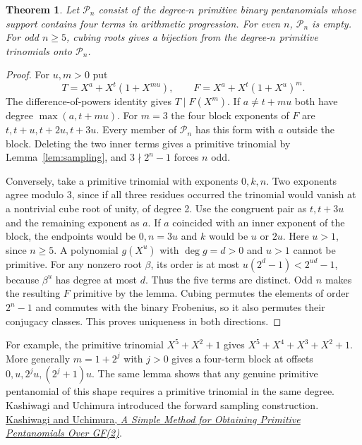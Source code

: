 \documentclass[11pt]{article}
\newtheorem{theorem}{Theorem}
\begin{document}
\begin{theorem}\label{thm:progression}
Let \(\mathcal P_n\) consist of the degree-\(n\) primitive binary
pentanomials whose support contains four terms in arithmetic progression.
For even \(n\), \(\mathcal P_n\) is empty. For odd \(n\ge5\), cubing
roots gives a bijection from the degree-\(n\) primitive trinomials
onto \(\mathcal P_n\).
\end{theorem}
\begin{proof}
For \(u,m>0\) put
\[
 T=X^a+X^t(1+X^{mu}),\qquad F=X^a+X^t(1+X^u)^m .
\]
The difference-of-powers identity gives \(T\mid F(X^m)\). If
\(a\ne t+mu\) both have degree \(\max(a,t+mu)\). For \(m=3\) the
four block exponents of \(F\) are \(t,t+u,t+2u,t+3u\). Every member
of \(\mathcal P_n\) has this form with \(a\) outside the block.
Deleting the two inner terms gives a primitive trinomial by
Lemma~\ref{lem:sampling}, and \(3\nmid 2^n-1\) forces \(n\) odd.

Conversely, take a primitive trinomial with exponents \(0,k,n\).
Two exponents agree modulo 3, since if all three residues occurred the
trinomial would vanish at a nontrivial cube root of unity, of degree 2.
Use the congruent pair as \(t,t+3u\) and the remaining exponent as \(a\).
If \(a\) coincided with an inner exponent of the block, the endpoints
would be \(0,n=3u\) and \(k\) would be \(u\) or \(2u\).
Here \(u>1\), since \(n\ge5\). A polynomial \(g(X^u)\) with
\(\deg g=d>0\) and \(u>1\) cannot be primitive. For any nonzero
root \(\beta\), its order is at most \(u(2^d-1)<2^{ud}-1\),
because \(\beta^u\) has degree at most \(d\).
Thus the five terms are distinct. Odd \(n\) makes the resulting \(F\)
primitive by the lemma. Cubing permutes the elements of order \(2^n-1\)
and commutes with the binary Frobenius, so it also permutes their
conjugacy classes. This proves uniqueness in both directions.
\end{proof}
For example, the primitive trinomial \(X^5+X^2+1\) gives
\(X^5+X^4+X^3+X^2+1\).
More generally \(m=1+2^j\) with \(j>0\) gives a four-term block
at offsets \(0,u,2^j u,(2^j+1)u\). The same lemma shows that any
genuine primitive pentanomial of this shape requires a primitive
trinomial in the same degree. Kashiwagi and Uchimura introduced the
forward sampling construction.
\href{https://doi.org/10.9746/sicetr1965.18.747}{Kashiwagi and Uchimura,
\emph{A Simple Method for Obtaining Primitive Pentanomials Over GF(2)}}.
\end{document}
